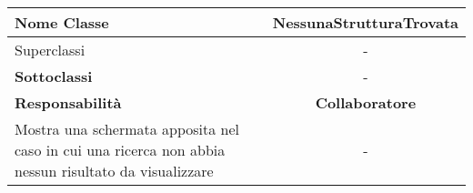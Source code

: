 
\setcounter{table}{0}
\begin{table}[H]
    \centering
    \begin{tabularx}{\textwidth}{||   X  ||  c   ||}
        \hline
        \rowcolor{Gray}
        \textbf{Nome Classe} & NessunaStrutturaTrovata\\
        \hline
        Superclassi  &  - \\
        \hline
        \textbf{Sottoclassi} & - \\
        \hline
        \hline
         \textbf{Responsabilità} & \textbf{Collaboratore} \\
         \hline
           Mostra una schermata apposita nel caso in cui una ricerca
           non abbia nessun risultato da visualizzare & - \\
         \hline
    \end{tabularx}
\end{table}
